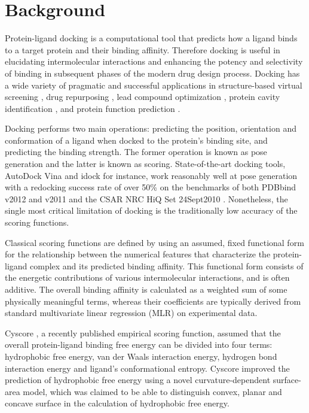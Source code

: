 \section{Background}

Protein-ligand docking is a computational tool that predicts how a ligand binds to a target protein and their binding affinity. Therefore docking is useful in elucidating intermolecular interactions and enhancing the potency and selectivity of binding in subsequent phases of the modern drug design process. Docking has a wide variety of pragmatic and successful applications in structure-based virtual screening \citep{1383}, drug repurposing \citep{1384}, lead compound optimization \citep{1385}, protein cavity identification \citep{1217}, and protein function prediction \citep{1386}.

Docking performs two main operations: predicting the position, orientation and conformation of a ligand when docked to the protein's binding site, and predicting the binding strength. The former operation is known as pose generation and the latter is known as scoring. State-of-the-art docking tools, AutoDock Vina \citep{595} and idock \citep{1153} for instance, work reasonably well at pose generation with a redocking success rate of over 50\% \citep{1362} on the benchmarks of both PDBbind v2012 and v2011 \citep{529,530} and the CSAR NRC HiQ Set 24Sept2010 \citep{857,960}. Nonetheless, the single most critical limitation of docking is the traditionally low accuracy of the scoring functions.

Classical scoring functions are defined by using an assumed, fixed functional form for the relationship between the numerical features that characterize the protein-ligand complex and its predicted binding affinity. This functional form consists of the energetic contributions of various intermolecular interactions, and is often additive. The overall binding affinity is calculated as a weighted sum of some physically meaningful terms, whereas their coefficients are typically derived from standard multivariate linear regression (MLR) on experimental data.

Cyscore \citep{1372}, a recently published empirical scoring function, assumed that the overall protein-ligand binding free energy can be divided into four terms: hydrophobic free energy, van der Waals interaction energy, hydrogen bond interaction energy and ligand's conformational entropy. Cyscore improved the prediction of hydrophobic free energy using a novel curvature-dependent surface-area model, which was claimed to be able to distinguish convex, planar and concave surface in the calculation of hydrophobic free energy.


